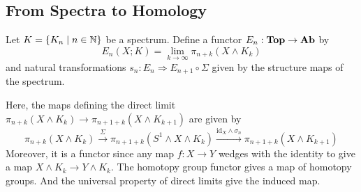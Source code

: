 \subsection{From Spectra to Homology}
\begin{defn}\label{defn:HomSpec} Let $K=\{K_n\;|\;n\in\mathbb{N}\}$ be a spectrum. Define a functor $E_n:\bold{Top}\to\bold{Ab}$ by $$E_n(X;K)=\lim_{k\to\infty}\pi_{n+k}(X\wedge K_k)$$ and natural transformations $s_n:E_n\Rightarrow E_{n+1}\circ\Sigma$ given by the structure maps of the spectrum. 
\end{defn}

Here, the maps defining the direct limit $\pi_{n+k}(X\wedge K_k)\to\pi_{n+1+k}(X\wedge K_{k+1})$ are given by $$\pi_{n+k}(X\wedge K_k)\overset{\Sigma}{\rightarrow}\pi_{n+1+k}(S^1\wedge X\wedge K_k)\overset{\text{id}_X\wedge\sigma_n}{\rightarrow}\pi_{n+1+k}(X\wedge K_{k+1})$$ Moreover, it is a functor since any map $f:X\to Y$ wedges with the identity to give a map $X\wedge K_k\to Y\wedge K_k$. The homotopy group functor gives a map of homotopy groups. And the universal property of direct limits give the induced map. 

